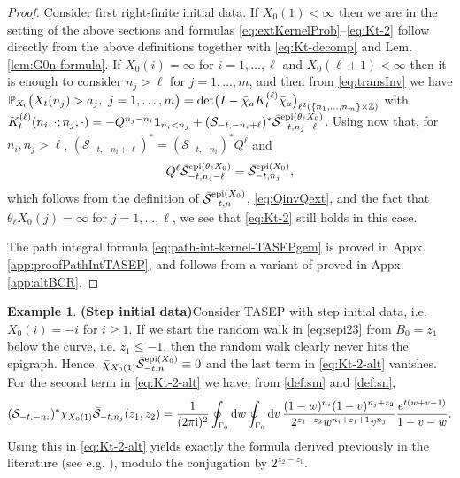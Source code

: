 \documentclass[letterpaper,reqno,11pt,oneside,final]{amsart}
\theoremstyle{definition}
\newtheorem{ex}[thm]{Example}
\newcommand{\I}{\uptext{i}}
\newcommand{\pp}{\mathbb{P}}
\newcommand{\zz}{\mathbb{Z}}
\newcommand{\uno}[1]{\mathbf{1}_{#1}}
\newcommand{\tsm}{\hspace{-0.1em}}
\newcommand{\uptext}[1]{\text{\upshape{#1}}}
\DeclareMathOperator{\epi}{\uptext{epi}}
\DeclareMathOperator{\oepi}{\epi}
\renewcommand{\d}{\mathrm{d}}
\newcommand{\SM}{\mathcal{S}}
\newcommand{\SN}{\bar{\mathcal{S}}}
\renewcommand{\P}{\chi}
\numberwithin{equation}{section}
\begin{document}
\begin{proof}
Consider first right-finite initial data. 
If $X_0(1)<\infty$ then we are in the setting of the above sections and formulas \eqref{eq:extKernelProb}--\eqref{eq:Kt-2} follow directly from the above definitions together with \eqref{eq:Kt-decomp} and Lem. \ref{lem:G0n-formula}.
If $X_0(i)=\infty$ for $i=1,\dotsc,\ell$ and $X_0(\ell+1)<\infty$ then it is enough to consider $n_j>\ell$ for $j=1,\dotsc,m$, and then from \eqref{eq:transInv} we have $\pp_{X_0}\tsm\big(X_t(n_j)>a_j,~j=1,\dotsc,m\big)=\det\!\big(I-\bar\chi_aK^{(\ell)}_t\bar\chi_a\big)_{\ell^2(\{n_1,\dotsc,n_m\}\times\zz)}$ with $K^{(\ell)}_t(n_i,\cdot;n_j,\cdot)=-Q^{n_j-n_i}\uno{n_i<n_j}+(\SM_{-t,-{n}_i+\ell})^*\SN_{-t,n_j-\ell}^{\oepi(\theta_{\ell} X_0)}$.
Using now that, for $n_i,n_j>\ell$, $(\SM_{-t,-{n}_i+\ell})^*=(\SM_{-t,-{n}_i})^*Q^{\ell}$ and 
\begin{equation}\label{eq:epishift}
Q^{\ell}\SN_{-t,n_j-\ell}^{\oepi(\theta_{\ell} X_0)}=\SN_{-t,n_j}^{\oepi(X_0)},
\end{equation}
which follows from the definition of $\SN_{-t,n}^{\oepi(X_0)}$, \eqref{eq:QinvQext}, and the fact that $\theta_{\ell}X_0(j)=\infty$ for $j=1,\dotsc,\ell$, we see that \eqref{eq:Kt-2} still holds in this case.

The path integral formula \eqref{eq:path-int-kernel-TASEPgem} is proved in Appx.\,\ref{app:proofPathIntTASEP}, and follows from a variant of \cite[Thm. 3.3]{bcr} proved in Appx.\,\ref{app:altBCR}.
\end{proof}

\begin{ex}{\bf (Step initial data)}\label{ex:step}
\enspace Consider TASEP with step initial data, i.e. $X_0(i) = -i$ for $i \geq 1$.
If we start the random walk in \eqref{eq:sepi23} from $B_0 = z_1$ below the curve, i.e. $z_1 \leq -1$, then the random walk clearly never hits the epigraph. 
Hence, $\bar\P_{X_0(1)}{\SN}_{-t,n}^{\oepi(X_0)} \equiv 0$ and the last term in \eqref{eq:Kt-2-alt} vanishes. 
For the second term in \eqref{eq:Kt-2-alt} we have, from \eqref{def:sm} and \eqref{def:sn},
\begin{align}
 (\SM_{-t,-{n}_i})^*\P_{X_0(1)}\SN_{-t,{n}_j}(z_1, z_2) = \frac{1}{(2\pi\I)^2} \oint_{\Gamma_0}\d w \oint_{\Gamma_0}\d v\, \frac{(1-w)^{n_i} (1-v)^{n_j + z_2}}{2^{z_1-z_2} w^{n_i + z_1 +1} v^{n_j}} \frac{e^{t(w + v-1)}}{1 - v - w}.
\end{align}
Using this in \eqref{eq:Kt-2-alt} yields exactly the formula derived previously in the literature (see e.g. \cite[Eq. 82]{dimers}), modulo the conjugation by $2^{z_2-z_1}$.
\end{ex}
\end{document}
